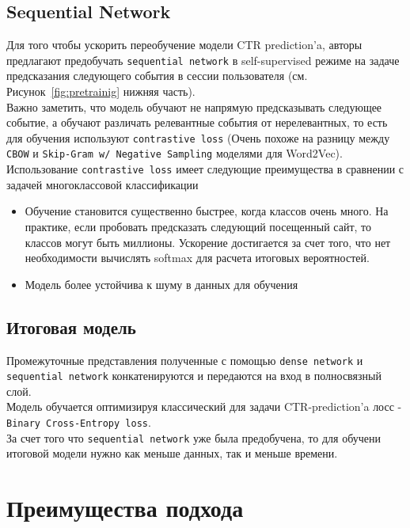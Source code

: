 \subsection{Sequential Network}

Для того чтобы ускорить переобучение модели CTR prediction'a, авторы предлагают предобучать \texttt{sequential network} в self-supervised режиме на задаче предсказания следующего события в сессии пользователя (см. Рисунок~\ref{fig:pretrainig} нижняя часть). \\

Важно заметить, что модель обучают не напрямую предсказывать следующее событие, а обучают различать релевантные события от нерелевантных, то есть для обучения используют \texttt{contrastive loss} (Очень похоже на разницу между \texttt{CBOW} и \texttt{Skip-Gram w/ Negative Sampling} моделями для Word2Vec). \\

Использование \texttt{contrastive loss} имеет следующие преимущества в сравнении с задачей многоклассовой классификации
\begin{itemize}
    \item Обучение становится существенно быстрее, когда классов очень много. На практике, если пробовать предсказать следующий посещенный сайт, то классов могут быть миллионы. Ускорение достигается за счет того, что нет необходимости вычислять softmax для расчета итоговых вероятностей.
    \item Модель более устойчива к шуму в данных для обучения
\end{itemize}

\subsection{Итоговая модель}

Промежуточные представления полученные с помощью  \texttt{dense network} и \texttt{sequential network} конкатенируются и передаются на вход в полносвязный слой. \\

Модель обучается оптимизируя классический для задачи CTR-prediction'a лосс - \texttt{Binary Cross-Entropy loss}. \\

За счет того что \texttt{sequential network} уже была предобучена, то для обучени итоговой модели нужно как меньше данных, так и меньше времени.

\section{Преимущества подхода}

